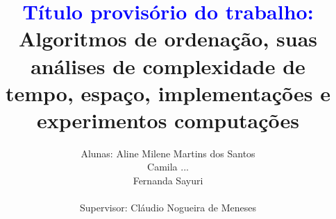 \documentclass[12pt]{book}
\title{\LARGE \bf \textcolor{blue}{Título provisório do trabalho:} Algoritmos de ordenação, suas análises de complexidade de tempo, espaço, implementações e experimentos computações}
\author{Alunas: Aline Milene Martins dos Santos\\
                Camila ...\\
                Fernanda Sayuri \\\\
Supervisor: Cláudio Nogueira de Meneses}
\begin{document}
\maketitle
\listofalgorithms
\tableofcontents








\appendix


\nocite{manber1989introduction,bubble_sort,Harder2020,Astrachan,Halstead1977,Purnomo_Putra_2023}


\end{document}
